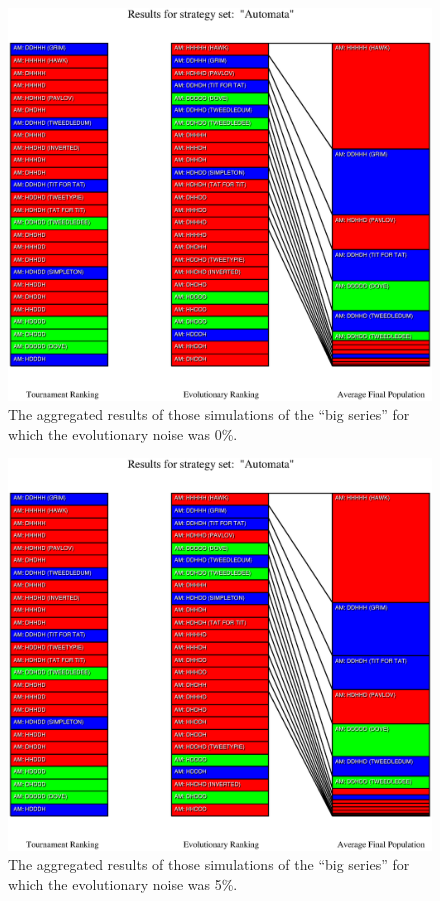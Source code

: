 \begin{figure}
\begin{center}
\includegraphics[width=20cm]{tables/Automata_N0.000.eps}
\caption{\label{Automata_N0000} The aggregated results of those
simulations of the ``big series'' for which the evolutionary noise was 0\%.}
\end{center}
\end{figure}

\begin{figure}
\begin{center}
\includegraphics[width=20cm]{tables/Automata_N0.050.eps}
\caption{\label{Automata_N0050} The aggregated results of those
simulations of the ``big series'' for which the evolutionary noise was 5\%.}
\end{center}
\end{figure}

